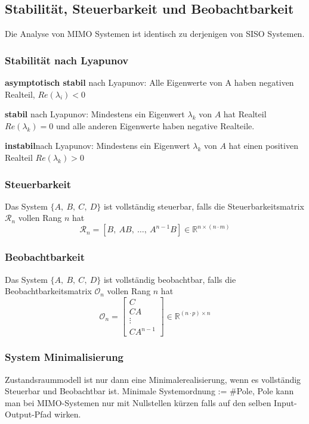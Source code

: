 \subsection{Stabilität, Steuerbarkeit und Beobachtbarkeit}
    Die Analyse von MIMO Systemen ist identisch zu derjenigen von SISO Systemen. 
    \subsubsection{Stabilität nach Lyapunov}
    \textbf{asymptotisch stabil} nach Lyapunov: 
    Alle Eigenwerte von A haben negativen Realteil, $Re(\lambda_i) < 0$
    
    \textbf{stabil} nach Lyapunov:
    Mindestens ein Eigenwert $\lambda_k$ von $A$ hat Realteil $Re(\lambda_k) = 0$ und alle anderen Eigenwerte haben negative Realteile.
    
    \textbf{instabil}nach Lyapunov:
    Mindestens ein Eigenwert $\lambda_k$ von $A$ hat einen positiven Realteil $Re(\lambda_k) > 0$
    
    \subsubsection{Steuerbarkeit}
        Das System $\{A,\ B,\ C,\ D\}$ ist vollständig steuerbar, falls die Steuerbarkeitsmatrix $\mathcal{R}_n$ vollen Rang $n$ hat
    \[\mathcal{R}_n = [B,\ AB,\ \dots,\ A^{n-1}B]\in \mathbb{R}^{n\times(n\cdot m)}\]
    
    \subsubsection{Beobachtbarkeit}
        Das System $\{A,\ B,\ C,\ D\}$ ist vollständig beobachtbar, falls die Beobachtbarkeitsmatrix $\mathcal{O}_n$ vollen Rang $n$ hat
        \[\mathcal{O}_n = \begin{bmatrix} C\\ CA\\ \vdots\\ CA^{n-1}\end{bmatrix}\in \mathbb{R}^{(n\cdot p)\times n}\]
    \subsubsection{System Minimalisierung}
        Zustandsraummodell ist nur dann eine Minimalerealisierung, wenn es vollständig Steuerbar und Beobachtbar ist.
        Minimale Systemordnung := \#Pole, Pole kann man bei MIMO-Systemen nur mit Nullstellen kürzen falls auf den selben Input-Output-Pfad wirken.
        
        